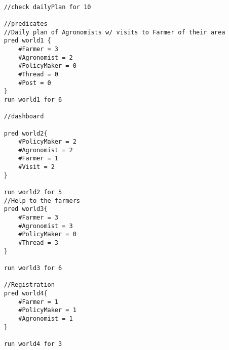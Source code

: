 \begin{lstlisting}[language=alloy]
    
    //check dailyPlan for 10
    
    //predicates
    //Daily plan of Agronomists w/ visits to Farmer of their area
    pred world1 {
        #Farmer = 3
        #Agronomist = 2
        #PolicyMaker = 0
        #Thread = 0
        #Post = 0
    }
    run world1 for 6
    
    //dashboard 
    
    pred world2{
        #PolicyMaker = 2
        #Agronomist = 2
        #Farmer = 1
        #Visit = 2
    }
    
    run world2 for 5
    //Help to the farmers
    pred world3{
        #Farmer = 3
        #Agronomist = 3
        #PolicyMaker = 0
        #Thread = 3
    }
    
    run world3 for 6
    
    //Registration
    pred world4{
        #Farmer = 1
        #PolicyMaker = 1
        #Agronomist = 1
    }
    
    run world4 for 3
\end{lstlisting}    
